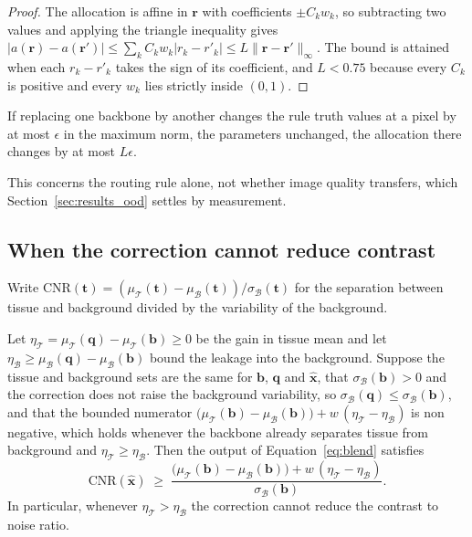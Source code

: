 \begin{proof}
The allocation is affine in $\mathbf{r}$ with coefficients $\pm C_k w_k$, so subtracting two values
and applying the triangle inequality gives
$|a(\mathbf{r}) - a(\mathbf{r}')| \le \sum_k C_k w_k |r_k - r'_k| \le L \lVert \mathbf{r} - \mathbf{r}' \rVert_\infty$.
The bound is attained when each $r_k - r'_k$ takes the sign of its coefficient, and $L < 0.75$
because every $C_k$ is positive and every $w_k$ lies strictly inside $(0,1)$.
\end{proof}

\begin{corollary}
\label{cor:transfer}
If replacing one backbone by another changes the rule truth values at a pixel by at most $\epsilon$
in the maximum norm, the parameters unchanged, the allocation there changes by at most $L\epsilon$.
\end{corollary}

This concerns the routing rule alone, not whether image quality transfers, which
Section~\ref{sec:results_ood} settles by measurement.

\subsection{When the correction cannot reduce contrast}
Write
$\mathrm{CNR}(\mathbf{t}) = (\mu_\mathcal{T}(\mathbf{t}) - \mu_\mathcal{B}(\mathbf{t})) / \sigma_\mathcal{B}(\mathbf{t})$
for the separation between tissue and background divided by the variability of the background.

\begin{theorem}
\label{thm:cnr}
Let $\eta_\mathcal{T} = \mu_\mathcal{T}(\mathbf{q}) - \mu_\mathcal{T}(\mathbf{b}) \ge 0$ be the gain in
tissue mean and let $\eta_\mathcal{B} \ge \mu_\mathcal{B}(\mathbf{q}) - \mu_\mathcal{B}(\mathbf{b})$
bound the leakage into the background. Suppose the tissue and background sets are the same for
$\mathbf{b}$, $\mathbf{q}$ and $\hat{\mathbf{x}}$, that
$\sigma_\mathcal{B}(\mathbf{b}) > 0$ and the correction does not raise the background variability, so
$\sigma_\mathcal{B}(\mathbf{q}) \le \sigma_\mathcal{B}(\mathbf{b})$, and that the bounded numerator
$\big(\mu_\mathcal{T}(\mathbf{b}) - \mu_\mathcal{B}(\mathbf{b})\big) + w\,(\eta_\mathcal{T} -
\eta_\mathcal{B})$ is non negative, which holds whenever the backbone already separates tissue from
background and $\eta_\mathcal{T} \ge \eta_\mathcal{B}$. Then the output of
Equation~\eqref{eq:blend} satisfies
\begin{equation}
\mathrm{CNR}(\hat{\mathbf{x}}) \;\ge\;
\frac{\big(\mu_\mathcal{T}(\mathbf{b}) - \mu_\mathcal{B}(\mathbf{b})\big) + w\,(\eta_\mathcal{T} - \eta_\mathcal{B})}
     {\sigma_\mathcal{B}(\mathbf{b})} .
\label{eq:cnr_bound}
\end{equation}
In particular, whenever $\eta_\mathcal{T} > \eta_\mathcal{B}$ the correction cannot reduce the
contrast to noise ratio.
\end{theorem}

